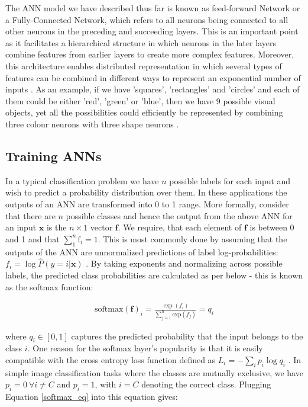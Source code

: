 \documentclass[12pt]{report}
\begin{document}
The ANN model we have described thus far is known as feed-forward Network or a Fully-Connected Network, which refers to all neurons being connected to all other neurons in the preceding and succeeding layers. This is an important point as it facilitates a hierarchical structure in which neurons in the later layers combine features from earlier layers to create more complex features. Moreover, this architecture enables distributed representation in which several types of features can be combined in different ways to represent an exponential number of inputs \cite{Hinton1985}. As an example, if we have 'squares', 'rectangles' and 'circles' and each of them could be either 'red', 'green' or 'blue', then we have 9 possible visual objects, yet all the possibilities could efficiently be represented by combining three colour neurons with three shape neurons \cite{Goodfellow2016}. 

\subsection{Training ANNs} \label{sec:trainANN}

In a typical classification problem we have $n$ possible labels for each input and wish to predict a probability distribution over them. In these applications the outputs of an ANN are transformed into 0 to 1 range. More formally, consider that there are $n$ possible classes and hence the output from the above ANN for an input $\mathbf{x}$ is the $n \times 1$ vector $\mathbf{f}$. We require, that each element of $\mathbf{f}$ is between 0 and 1 and that $\sum_1^n \text{f}_i = 1$. This is most commonly done by assuming that the outputs of the ANN are unnormalized predictions of label log-probabilities: $f_i = \log \hat{P}(y = i | \mathbf{x})$ \cite{Goodfellow2016}. By taking exponents and normalizing across possible labels, the predicted class probabilities are calculated as per below - this is known as the softmax function:

\begin{align} \label{softmax_eq}
  \text{softmax}(\mathbf{f})_i = \frac{\exp (f_i)}{\sum_{j=1}^n \text{exp}(f_j)}=q_i
\end{align}

where $q_i \in [0,1]$ captures the predicted probability that the input belongs to the class $i$. One reason for the softmax layer's popularity is that it is easily compatible with the cross entropy loss function defined as $L_i=-\sum_i p_i \log q_i$ \cite{Shannon1948}. In simple image classification tasks where the classes are mutually exclusive, we have $p_i=0 \ \forall i\ne C$ and $p_i=1$, with $i=C$ denoting the correct class. Plugging Equation \ref{softmax_eq} into this equation gives:
\end{document}
